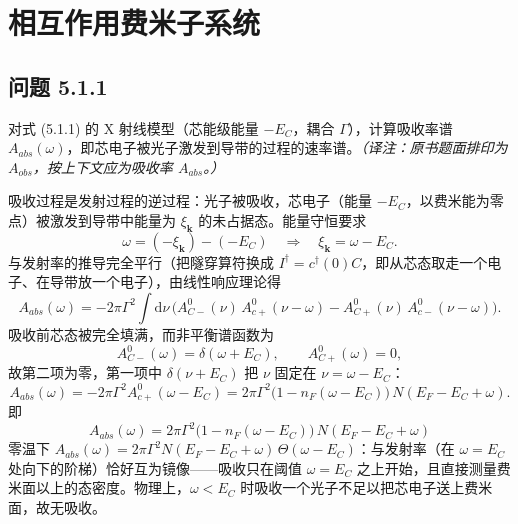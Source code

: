 \chapter{相互作用费米子系统}

\section*{问题 5.1.1}
\begin{problem}
对式 (5.1.1) 的 X 射线模型（芯能级能量 $-E_C$，耦合 $\Gamma$），计算吸收率谱 $A_{abs}(\omega)$，即芯电子被光子激发到导带的过程的速率谱。\emph{（译注：原书题面排印为 $A_{obs}$，按上下文应为吸收率 $A_{abs}$。）}
\end{problem}
\solution

吸收过程是发射过程的逆过程：光子被吸收，芯电子（能量 $-E_C$，以费米能为零点）被激发到导带中能量为 $\xi_{\pmb{k}}$ 的未占据态。能量守恒要求
\begin{equation*}
\omega=(-\xi_{\pmb{k}})-(-E_C)\quad\Longrightarrow\quad \xi_{\pmb{k}}=\omega-E_C .
\end{equation*}
与发射率的推导完全平行（把隧穿算符换成 $I^{\dagger}=c^{\dagger}(0)C$，即从芯态取走一个电子、在导带放一个电子），由线性响应理论得
\begin{equation*}
A_{abs}(\omega)=-2\pi\Gamma^{2}\int\mathrm{d}\nu\,\big(A_{C-}^{0}(\nu)\,A_{c+}^{0}(\nu-\omega)-A_{C+}^{0}(\nu)\,A_{c-}^{0}(\nu-\omega)\big).
\end{equation*}
吸收前芯态被完全填满，而非平衡谱函数为
\begin{equation*}
A_{C-}^{0}(\omega)=\delta(\omega+E_C),\qquad A_{C+}^{0}(\omega)=0 ,
\end{equation*}
故第二项为零，第一项中 $\delta(\nu+E_C)$ 把 $\nu$ 固定在 $\nu=\omega-E_C$：
\begin{equation*}
A_{abs}(\omega)=-2\pi\Gamma^{2}A_{c+}^{0}(\omega-E_C)
=2\pi\Gamma^{2}\big(1-n_F(\omega-E_C)\big)\,N(E_F-E_C+\omega).
\end{equation*}
即
\begin{equation*}
\boxed{\;A_{abs}(\omega)=2\pi\Gamma^{2}\big(1-n_F(\omega-E_C)\big)\,N(E_F-E_C+\omega)\;}
\end{equation*}
零温下 $A_{abs}(\omega)=2\pi\Gamma^{2}N(E_F-E_C+\omega)\,\Theta(\omega-E_C)$：与发射率（在 $\omega=E_C$ 处向下的阶梯）恰好互为镜像——吸收只在阈值 $\omega=E_C$ 之上开始，且直接测量费米面以上的态密度。物理上，$\omega<E_C$ 时吸收一个光子不足以把芯电子送上费米面，故无吸收。


